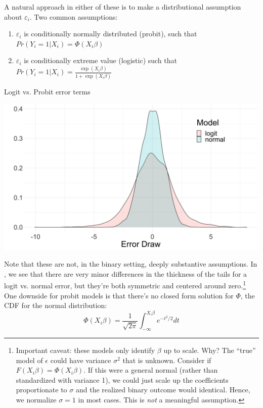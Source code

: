 \documentclass{tufte-handout}
\theoremstyle{break}
\begin{document}
A natural approach in either of these is to make a distributional assumption about $\varepsilon_{i}$. Two common assumptions:
\begin{enumerate}
\item $\varepsilon_{i}$ is conditionally normally distributed (probit), such that $Pr(Y_{i} = 1 | X_{i}) = \Phi(X_{i}\beta)$
\item $\varepsilon_{i}$ is conditionally extreme value (logistic) such that
$Pr(Y_{i} = 1 | X_{i}) = \frac{\exp(X_{i}\beta)}{1+\exp(X_{i}\beta)}$
\end{enumerate}
\begin{marginfigure}
    \caption{Logit vs. Probit error terms}
    \label{fig:logit_v_normal}
    \includegraphics[width=\linewidth]{../lectures/images/logit_v_normal.png}
\end{marginfigure}

Note that these are not, in the binary setting, deeply substantive assumptions. In , we see that there are very minor differences in the thickness of the tails for a logit vs. normal error, but they're both symmetric and centered around zero.\footnote{Important caveat: these models only identify $\beta$  up to scale.  Why?  The ``true'' model of $\epsilon$ could have variance  $\sigma^{2}$ that is unknown. 
Consider if $F(X_{i}\beta) = \Phi(X_{i}\beta)$. If this were a general normal (rather than standardized with variance 1), we could just scale up the coefficients proportionate to $\sigma$ and the realized binary outcome would identical.  Hence, we normalize $\sigma = 1$ in most cases. This is \emph{not} a meaningful assumption.} One downside for probit models is that there's no closed form solution for $\Phi$, the CDF for the normal distribution:
\begin{equation}   
    \Phi(X_{i}\beta) = \frac{1}{\sqrt{2\pi}}\int_{-\infty}^{X_{i}\beta}e^{-t^{2}/2}dt
\end{equation}
\end{document}
